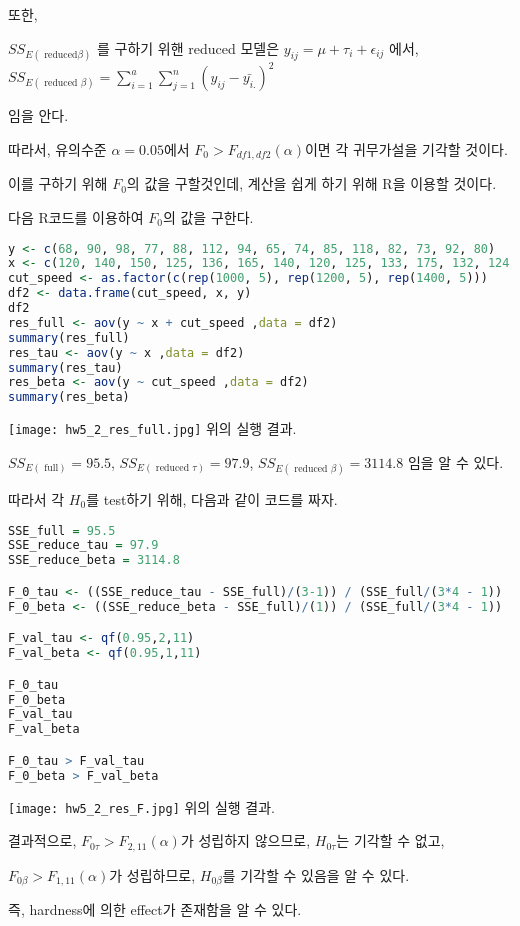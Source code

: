 \documentclass{article}
\begin{document}
또한, 

$SS_{E(\text { reduced} \beta )}$ 를 구하기 위핸 reduced 모델은
$y_{ij} = \mu + \tau_i + \epsilon_{ij}$ 에서,
$SS_{E(\text { reduced } \beta)} = \sum_{i=1}^a \sum_{j=1}^n (y_{ij} - \bar{y_{i.}})^2$

임을 안다.


따라서, 유의수준 $\alpha = 0.05$에서 $F_0 > F_{df1, df2}(\alpha)$이면 각 귀무가설을 기각할 것이다.

이를 구하기 위해 $F_0$의 값을 구할것인데, 계산을 쉽게 하기 위해 R을 이용할 것이다.

다음 R코드를 이용하여 $F_0$의 값을 구한다.


\begin{lstlisting}[language=R]
y <- c(68, 90, 98, 77, 88, 112, 94, 65, 74, 85, 118, 82, 73, 92, 80)
x <- c(120, 140, 150, 125, 136, 165, 140, 120, 125, 133, 175, 132, 124, 141, 130)
cut_speed <- as.factor(c(rep(1000, 5), rep(1200, 5), rep(1400, 5)))
df2 <- data.frame(cut_speed, x, y)
df2 
res_full <- aov(y ~ x + cut_speed ,data = df2)
summary(res_full)
res_tau <- aov(y ~ x ,data = df2)
summary(res_tau)
res_beta <- aov(y ~ cut_speed ,data = df2)
summary(res_beta)
\end{lstlisting}

\begin{center}
    \texttt{[image: hw5\_2\_res\_full.jpg]}
위의 실행 결과.
\end{center} 

$SS_{E(\text { full})} = 95.5$, $SS_{E(\text { reduced } \tau)} = 97.9$, $SS_{E(\text { reduced } \beta)} = 3114.8$  임을 알 수 있다.

따라서 각 $H_0$를 test하기 위해, 다음과 같이 코드를 짜자.

\begin{lstlisting}[language=R]
SSE_full = 95.5
SSE_reduce_tau = 97.9
SSE_reduce_beta = 3114.8

F_0_tau <- ((SSE_reduce_tau - SSE_full)/(3-1)) / (SSE_full/(3*4 - 1))
F_0_beta <- ((SSE_reduce_beta - SSE_full)/(1)) / (SSE_full/(3*4 - 1))

F_val_tau <- qf(0.95,2,11)
F_val_beta <- qf(0.95,1,11)

F_0_tau
F_0_beta
F_val_tau
F_val_beta

F_0_tau > F_val_tau
F_0_beta > F_val_beta
\end{lstlisting}

\begin{center}
    \texttt{[image: hw5\_2\_res\_F.jpg]}
위의 실행 결과.
\end{center} 

결과적으로, $F_{0\tau}> F_{2, 11}(\alpha)$가 성립하지 않으므로, $H_{0\tau}$는 기각할 수 없고,

$F_{0\beta}> F_{1, 11}(\alpha)$가 성립하므로, $H_{0\beta}$를 기각할 수 있음을 알 수 있다.

즉, hardness에 의한 effect가 존재함을 알 수 있다.
\end{document}
